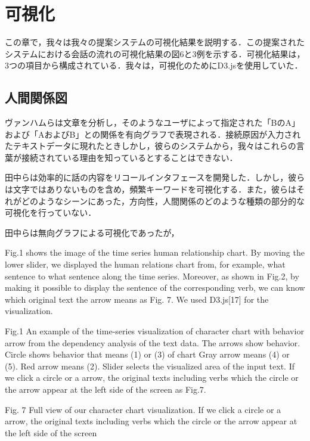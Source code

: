 \documentclass[shuuron]{kuee}
\begin{document}

\section{可視化}

この章で，我々は我々の提案システムの可視化結果を説明する．この提案されたシステムにおける会話の流れの可視化結果の図6と3例を示する．可視化結果は，3つの項目から構成されている．我々は，可視化のためにD3.js\cite{vand3}を使用していた．%



\subsection{人間関係図}

ヴァンハムら\cite{van2009mapping}は文章を分析し，そのようなユーザによって指定された「BのA」および「AおよびB」との関係を有向グラフで表現される．接続原因が入力されたテキストデータに現れたときしかし，彼らのシステムから，我々はこれらの言葉が接続されている理由を知っているとすることはできない．

田中ら\cite{tanaka}は効率的に話の内容をリコールインタフェースを開発した．しかし，彼らは文字ではありないものを含め，頻繁キーワードを可視化する．また，彼らはそれがどのようなシーンにあった，方向性，人間関係のどのような種類の部分的な可視化を行っていない．

田中らは無向グラフによる可視化であったが，

  Fig.1 shows the image of the time series human relationship chart. By moving the lower slider, we displayed the human relations chart from, for example, what sentence to what sentence along the time series. Moreover, as shown in Fig.2, by making it possible to display the sentence of the corresponding verb, we can know which original text the arrow means as Fig. 7. We used D3.js[17] for the visualization.


Fig.1 An example of the time-series visualization of character chart with behavior arrow from the dependency analysis of the text data. The arrows show behavior. Circle shows behavior that means (1) or (3) of chart Gray arrow means (4) or (5). Red arrow means (2). Slider selects the visualized area of the input text. If we click a circle or a arrow, the original texts including verbs which the circle or the arrow appear at the left side of the screen as Fig.7.

Fig. 7 Full view of our character chart visualization. If we click a circle or a arrow, the original texts including verbs which the circle or the arrow appear at the left side of the screen
\end{document}
